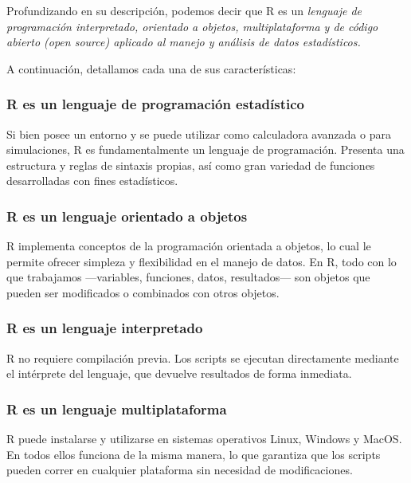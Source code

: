 \documentclass[
  spanish,
  letterpaper,
  DIV=11,
  numbers=noendperiod]{scrreprt}
\begin{document}
Profundizando en su descripción, podemos decir que R es un
\emph{lenguaje de programación interpretado, orientado a objetos,
multiplataforma y de código abierto (open source) aplicado al manejo y
análisis de datos estadísticos.}

A continuación, detallamos cada una de sus características:

\subsubsection{R es un lenguaje de programación
estadístico}\label{r-es-un-lenguaje-de-programaciuxf3n-estaduxedstico}

Si bien posee un entorno y se puede utilizar como calculadora avanzada o
para simulaciones, R es fundamentalmente un lenguaje de programación.
Presenta una estructura y reglas de sintaxis propias, así como gran
variedad de funciones desarrolladas con fines estadísticos.

\subsubsection{R es un lenguaje orientado a
objetos}\label{r-es-un-lenguaje-orientado-a-objetos}

R implementa conceptos de la programación orientada a objetos, lo cual
le permite ofrecer simpleza y flexibilidad en el manejo de datos. En R,
todo con lo que trabajamos ---variables, funciones, datos, resultados---
son objetos que pueden ser modificados o combinados con otros objetos.

\subsubsection{R es un lenguaje
interpretado}\label{r-es-un-lenguaje-interpretado}

R no requiere compilación previa. Los scripts se ejecutan directamente
mediante el intérprete del lenguaje, que devuelve resultados de forma
inmediata.

\subsubsection{R es un lenguaje
multiplataforma}\label{r-es-un-lenguaje-multiplataforma}

R puede instalarse y utilizarse en sistemas operativos Linux, Windows y
MacOS. En todos ellos funciona de la misma manera, lo que garantiza que
los scripts pueden correr en cualquier plataforma sin necesidad de
modificaciones.
\end{document}
